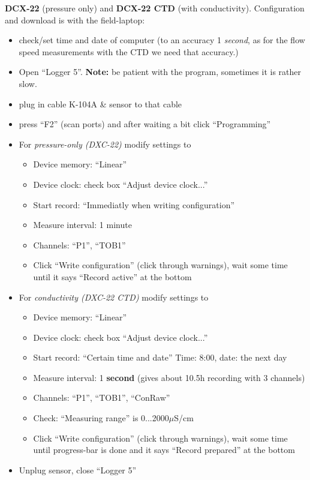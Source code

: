 \documentclass[DIV=15,halfparskip,11pt,headinclude]{scrartcl}
\begin{document}
\textbf{DCX-22} (pressure only) and \textbf{DCX-22 CTD} (with
conductivity).  Configuration and download is with the field-laptop:
\begin{itemize}
  \item check/set time and date of computer (to an accuracy 1
    \emph{second}, as for the flow speed measurements with the CTD we
    need that accuracy.)
  \item Open ``Logger 5''.  \textbf{Note:} be patient with the
    program, sometimes it is rather slow.
  \item plug in cable K-104A \& sensor to that cable
  \item press ``F2'' (scan ports) and after waiting a bit click ``Programming''
\item For \emph{pressure-only (DXC-22)} modify settings to
  \begin{itemize}
  \item Device memory: ``Linear''
  \item Device clock: check box ``Adjust device clock...''
    \item Start record: ``Immediatly when writing configuration''
\item Measure interval: 1 minute
\item Channels: ``P1'', ``TOB1''
\item Click ``Write configuration'' (click through warnings), wait
  some time until it says ``Record active'' at the bottom
\end{itemize}

\item For \emph{conductivity (DXC-22 CTD)} modify settings to
  \begin{itemize}
  \item Device memory: ``Linear''
  \item Device clock: check box ``Adjust device clock...''
  \item Start record: ``Certain time and date''
    Time: 8:00, date: the next day
\item Measure interval: 1 \textbf{second} (gives about 10.5h recording
  with 3 channels)
\item Channels: ``P1'', ``TOB1'', ``ConRaw''
  \item Check: ``Measuring range'' is 0...2000$\mu$S/cm
\item Click ``Write configuration'' (click through warnings), wait
  some time until progress-bar is done and it says ``Record prepared'' at the bottom
\end{itemize}

\item Unplug sensor, close ``Logger 5''
\end{itemize}
\end{document}
